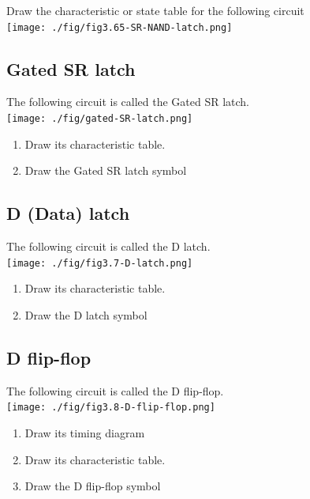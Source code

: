 \begin{prob}
Draw the characteristic or state table for the following circuit\\
  \texttt{[image: ./fig/fig3.65-SR-NAND-latch.png]} \\
\end{prob}

\subsection{Gated SR latch \cite[Sec~5.2]{stephen2022fundamentals}}

\begin{definition}
  The following circuit is called the Gated SR latch. \\
  \texttt{[image: ./fig/gated-SR-latch.png]} \\
  \begin{enumerate}
  \item Draw its characteristic table.
  \item Draw the Gated SR latch symbol
  \end{enumerate}
\end{definition}
\vspace{20em}

\subsection{D (Data) latch \cite[Sec~3.2.2]{harris2022digital}}

\begin{definition}[D latch]
  The following circuit is called the D latch. \\
  \texttt{[image: ./fig/fig3.7-D-latch.png]} \\
  \begin{enumerate}
  \item Draw its characteristic table.
  \item Draw the D latch symbol
  \end{enumerate}
\end{definition}
\vspace{20em}

\subsection{D flip-flop \cite[Sec~3.2.2]{harris2022digital}}

\begin{definition}
  The following circuit is called the D flip-flop. \\
  \texttt{[image: ./fig/fig3.8-D-flip-flop.png]} \\
  \begin{enumerate}
  \item Draw its timing  diagram
  \item Draw its characteristic table.
  \item Draw the D flip-flop symbol
  \end{enumerate}
\end{definition}
\vspace{20em}

